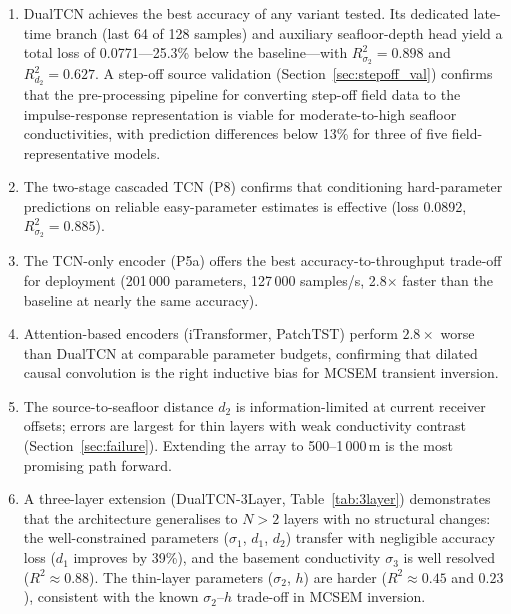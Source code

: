 \documentclass[journal]{IEEEtran}
\begin{document}
\begin{enumerate}[leftmargin=2em, itemsep=4pt]
  \item DualTCN achieves the best accuracy of any variant tested.
  Its dedicated late-time branch (last 64 of 128 samples) and
  auxiliary seafloor-depth head yield a total loss of 0.0771---25.3\%
  below the baseline---with $R^2_{\sigma_2} = 0.898$ and
  $R^2_{d_2} = 0.627$.  A step-off source validation
  (Section~\ref{sec:stepoff_val}) confirms that the pre-processing
  pipeline for converting step-off field data to the impulse-response
  representation is viable for moderate-to-high seafloor
  conductivities, with prediction differences below 13\% for three
  of five field-representative models.

  \item The two-stage cascaded TCN (P8) confirms that conditioning
  hard-parameter predictions on reliable easy-parameter estimates is
  effective (loss 0.0892, $R^2_{\sigma_2} = 0.885$).

  \item The TCN-only encoder (P5a) offers the best
  accuracy-to-throughput trade-off for deployment (201\,000
  parameters, 127\,000 samples/s, 2.8$\times$ faster than the
  baseline at nearly the same accuracy).

  \item Attention-based encoders (iTransformer, PatchTST) perform
  $2.8\times$ worse than DualTCN at comparable parameter budgets,
  confirming that dilated causal convolution is the right inductive
  bias for MCSEM transient inversion.

  \item The source-to-seafloor distance $d_2$ is information-limited
  at current receiver offsets; errors are largest for thin layers
  with weak conductivity contrast
  (Section~\ref{sec:failure}). Extending the array to
  500--1\,000\,m is the most promising path forward.

  \item A three-layer extension (DualTCN-3Layer,
  Table~\ref{tab:3layer}) demonstrates that the architecture
  generalises to $N > 2$ layers with no structural changes: the
  well-constrained parameters ($\sigma_1$, $d_1$, $d_2$) transfer
  with negligible accuracy loss ($d_1$ improves by 39\%), and the
  basement conductivity $\sigma_3$ is well resolved
  ($R^2 \approx 0.88$).  The thin-layer parameters ($\sigma_2$, $h$)
  are harder ($R^2 \approx 0.45$ and $0.23$), consistent with the
  known $\sigma_2$--$h$ trade-off in MCSEM inversion.


\end{enumerate}
\end{document}
